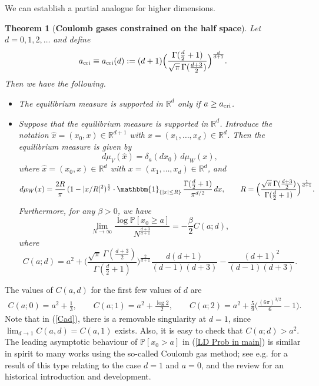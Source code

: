 \documentclass[10pt]{amsart}
\def\R{\mathbb{R}}
\theoremstyle{plain}
\newtheorem{thm}{Theorem}[section]
\theoremstyle{remark}
\numberwithin{equation}{section}
\begin{document}
We can establish a partial analogue for higher dimensions. 


 \begin{thm}[\textbf{Coulomb gases constrained on the half space}] \label{Thm_Coulomb half space}
Let $d=0,1,2,\dots$ and define 
\begin{equation} \label{acrit}
a_{\rm cri} \equiv a_{\rm cri}(d):= (d+1) \Big( \frac{ \Gamma(\frac{d}{2}+1)  }{ \sqrt{\pi} \, \Gamma(\frac{d+3}{2})   } \Big)^{ \frac{d}{d+1} }.
\end{equation}
Then we have the following.
\begin{itemize}
    \item[\textup{(i)}] The equilibrium measure is supported in $\R^d$ only if $a \ge a_{ \rm cri }$.  
    \smallskip 
     \item[\textup{(ii)}] Suppose that the equilibrium measure is supported in $\R^d$. 
    Introduce the notation $\hat{x}=(x_0,x) \in \R^{d+1}$ with $x=(x_1,\dots,x_d) \in \R^d$. Then the equilibrium measure is given by 
      \begin{equation} 
   d\mu_V(\hat{x})= \delta_{ a }(dx_0)\, d\mu_W(x), 
    \end{equation} 
    where $\hat{x}=(x_0,x) \in \R^d$ with $x=(x_1,\dots,x_d) \in \R^d$, and 
\begin{equation} \label{def of eq msr in a Rd}
d\mu_W(x)= \frac{2R}{\pi}   \,  (1-|x/R|^2)^{ \frac12 }  \cdot  \mathbbm{1}_{ \{ |x| \le R \} } \, \frac{ \Gamma(\frac{d}{2}+1) }{\pi^{ d/2 }} \,dx,  \qquad    R= \Big( \frac{ \sqrt{\pi} \, \Gamma(\frac{d+3}{2})   }{ \Gamma(\frac{d}{2}+1)  } \Big)^{ \frac{1}{d+1} }.  
\end{equation}
Furthermore, for any $\beta>0$, we have 
\begin{equation} \label{LD Prob in main}
\lim_{N \to \infty} \frac{ \log   \mathbb{P}[x_0 \ge a] }{ N^{ \frac{d+3}{d+1} } } = -\frac{\beta}{2} C(a;d),
\end{equation}
where  
\begin{equation}\label{Cad}
C(a;d)= a^2+ \Big( \frac{ \sqrt{\pi} \, \Gamma(\frac{d+3}{2})   }{ \Gamma(\frac{d}{2}+1)  } \Big)^{ \frac{2}{d+1} }\frac{d(d+1)}{(d-1)(d+3)}-  \frac{(d+1)^2}{(d-1)(d+3)} . 
\end{equation} 
\end{itemize} 
\end{thm}


The values of $C(a,d)$ for the first few values of $d$ are 
\begin{align}
C(a;0)=a^2+\frac{1}{3},
\qquad
 C(a;1) =a^2+ \frac{\log 2}{2}, \qquad
  C(a;2) =  a^2  +\frac{5}{9} \Big( \frac{(6\pi)^{3/2}}{6}-1 \Big). 
\end{align} 
Note that in (\ref{Cad}), there is a removable singularity at $d=1$, since $\lim_{d\to 1} C(a,d) = C(a,1)$ exists. Also, it is easy to check that $C(a;d)>a^2$. 
The leading asymptotic behaviour of $\mathbb{P}[ x_0 >a  ]$ in (\ref{LD Prob in main}) is similar in spirit to many works using the so-called Coulomb gas method; see e.g. \cite{MNSV11} for a result of this type relating to the case $d=1$ and $a=0$, and the review \cite{Fo14a} for an historical introduction and development.
 
\end{document}
